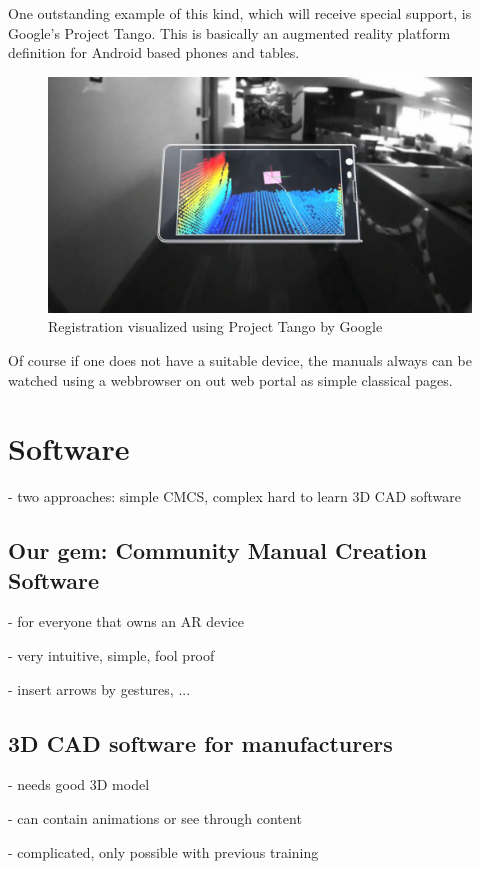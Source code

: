 		One outstanding example of this kind, which will receive special support, is Google's Project Tango. This is basically an augmented reality platform definition for Android based phones and tables.
		
		\begin{figure}[H]
			\centering
			\includegraphics[width=0.7\linewidth]{../images/project-tango}
			\caption{Registration visualized using Project Tango by Google}
			\label{fig:project-tango}
		\end{figure}
		
		Of course if one does not have a suitable device, the manuals always can be watched using a webbrowser on out web portal as simple classical pages.
		
	
	\section{Software}
	
		- two approaches: simple CMCS, complex hard to learn 3D CAD software
		
		\subsection{Our gem: Community Manual Creation Software}
		
			- for everyone that owns an AR device
			
			- very intuitive, simple, fool proof
			
			- insert arrows by gestures, ...
	
		\subsection{3D CAD software for manufacturers}
		
			- needs good 3D model
			
			- can contain animations or see through content

			- complicated, only possible with previous training

